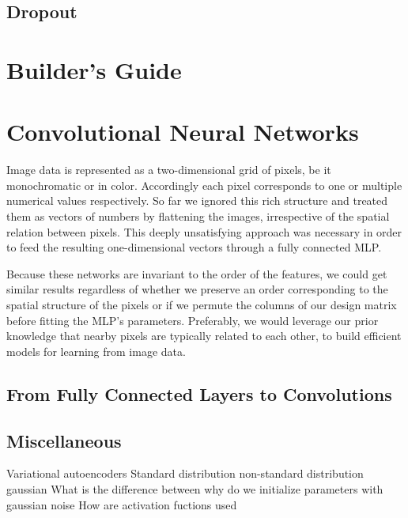 \documentclass[a4paper,12pt]{article}
\theoremstyle{definition}
\begin{document}
    \subsection*{Dropout}
    
    \section{Builder's Guide}

    \section{Convolutional Neural Networks}
    Image data is represented as a two-dimensional grid of pixels, be it monochromatic or in color. Accordingly each pixel corresponds to one or multiple numerical values
    respectively. So far we ignored this rich structure and treated them as vectors of numbers by flattening the images, irrespective of the spatial relation between pixels.
    This deeply unsatisfying approach was necessary in order to feed the resulting one-dimensional vectors through a fully connected MLP.

    Because these networks are invariant to the order of the features, we could get similar results regardless of whether we preserve an order corresponding to the spatial 
    structure of the pixels or if we permute the columns of our design matrix before fitting the MLP’s parameters. Preferably, we would leverage our prior knowledge that 
    nearby pixels are typically related to each other, to build efficient models for learning from image data.
    \subsection*{From Fully Connected Layers to Convolutions}

    \newpage
    \subsection*{Miscellaneous}
    Variational autoencoders
    Standard distribution
    non-standard distribution gaussian
    What is the difference between 
    why do we initialize parameters with gaussian noise
    How are activation fuctions used
\end{document}

